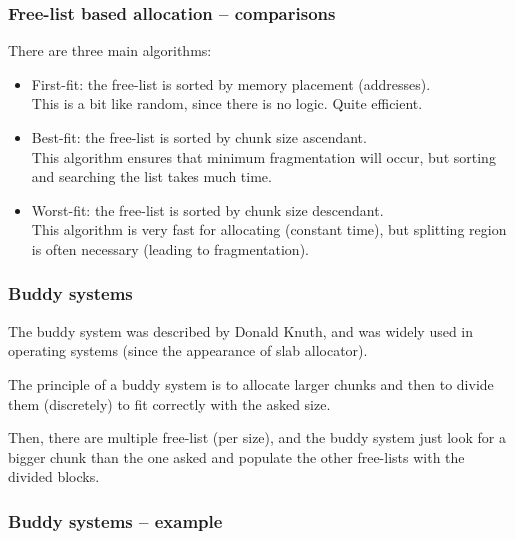 
\begin{frame}
  \frametitle{Free-list based allocation -- comparisons}

  There are three main algorithms:

  \begin{itemize}
  \item
    First-fit: the free-list is sorted by memory placement (addresses).\\
    This is a bit like random, since there is no logic. Quite efficient.
  \item
    Best-fit: the free-list is sorted by chunk size ascendant.\\
    This algorithm ensures that minimum fragmentation will occur, but
    sorting and searching the list takes much time.
  \item
    Worst-fit: the free-list is sorted by chunk size descendant.\\
    This algorithm is very fast for allocating (constant time), but
    splitting region is often necessary (leading to fragmentation).
  \end{itemize}

\end{frame}


\begin{frame}
  \frametitle{Buddy systems}

  The buddy system was described by Donald Knuth, and was widely used
  in operating systems (since the appearance of slab allocator).

  \-

  The principle of a buddy system is to allocate larger chunks and
  then to divide them (discretely) to fit correctly with the asked size.

  \-

  Then, there are multiple free-list (per size), and the buddy system
  just look for a bigger chunk than the one asked and populate the
  other free-lists with the divided blocks.

\end{frame}


\begin{frame}
  \frametitle{Buddy systems -- example}

  \begin{center}
  \end{center}

\end{frame}

